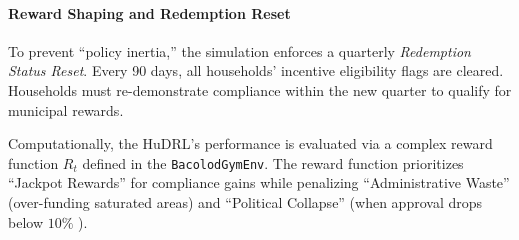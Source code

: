 \paragraph{Reward Shaping and Redemption Reset}
To prevent ``policy inertia,'' the simulation enforces a quarterly \textit{Redemption Status Reset}. Every 90 days, all households' incentive eligibility flags are cleared. Households must re-demonstrate compliance within the new quarter to qualify for municipal rewards. 

Computationally, the HuDRL's performance is evaluated via a complex reward function \(R_{t}\) defined in the \texttt{BacolodGymEnv}. The reward function prioritizes ``Jackpot Rewards'' for compliance gains while penalizing ``Administrative Waste'' (over-funding saturated areas) and ``Political Collapse'' (when approval drops below \(10\%\) ).

